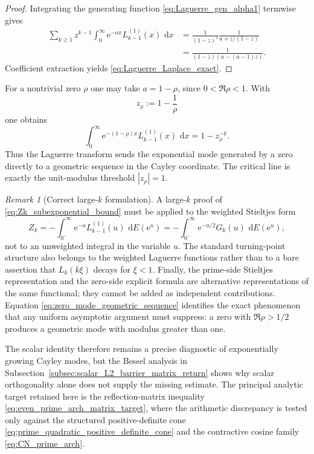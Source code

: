 \documentclass[11pt]{amsart}
\numberwithin{equation}{section}
\theoremstyle{plain}
\theoremstyle{definition}
\theoremstyle{remark}
\newtheorem{remark}[theorem]{Remark}
\newcommand{\e}{\mathrm e}
\newcommand{\dd}{\,\mathrm d}
\begin{document}
\begin{proof}
Integrating the generating function \eqref{eq:Laguerre_gen_alpha1} termwise gives
\begin{align}
 \sum_{k\ge1}z^{k-1}
 \int_0^\infty \e^{-ax}L_{k-1}^{(1)}(x)\,\dd x
 &=\frac{1}{(1-z)^2}
 \frac{1}{a+z/(1-z)}\\
 &=\frac{1}{(1-z)(a-(a-1)z)}.
\end{align}
Coefficient extraction yields \eqref{eq:Laguerre_Laplace_exact}.
\end{proof}

For a nontrivial zero $\rho$ one may take $a=1-\rho$, since $0<\Re\rho<1$.  With
\begin{equation}
 z_\rho:=1-\frac1\rho
 \label{eq:zrho_laguerre}
\end{equation}
one obtains
\begin{equation}
 \int_0^\infty
 \e^{-(1-\rho)x}L_{k-1}^{(1)}(x)\,\dd x
 =1-z_\rho^{-k}.
 \label{eq:zero_mode_geometric_sequence}
\end{equation}
Thus the Laguerre transform sends the exponential mode generated by a zero directly to a geometric sequence in the Cayley coordinate.  The critical line is exactly the unit-modulus threshold $|z_\rho|=1$.

\begin{remark}[Correct large-$k$ formulation]
\label{rem:laguerre_asymptotic_route}
A large-$k$ proof of \eqref{eq:Zk_subexponential_bound} must be applied to the weighted Stieltjes form
\begin{equation}
 Z_k
 =-\int_{0^-}^{\infty}
 \e^{-u}L_{k-1}^{(1)}(u)\,\dd E(\e^u)
 =-\int_{0^-}^{\infty}
 \e^{-u/2}G_k(u)\,\dd E(\e^u),
 \label{eq:Zk_weighted_u_form}
\end{equation}
not to an unweighted integral in the variable $u$.  The standard turning-point structure also belongs to the weighted Laguerre functions rather than to a bare assertion that $L_k(k\xi)$ decays for $\xi<1$.  Finally, the prime-side Stieltjes representation and the zero-side explicit formula are alternative representations of the same functional; they cannot be added as independent contributions.  Equation \eqref{eq:zero_mode_geometric_sequence} identifies the exact phenomenon that any uniform asymptotic argument must suppress: a zero with $\Re\rho>1/2$ produces a geometric mode with modulus greater than one.
\end{remark}

The scalar identity therefore remains a precise diagnostic of exponentially growing Cayley modes, but the Bessel analysis in Subsection~\ref{subsec:scalar_L2_barrier_matrix_return} shows why scalar orthogonality alone does not supply the missing estimate.  The principal analytic target retained here is the reflection-matrix inequality \eqref{eq:even_prime_arch_matrix_target}, where the arithmetic discrepancy is tested only against the structured positive-definite cone \eqref{eq:prime_quadratic_positive_definite_cone} and the contractive cosine family \eqref{eq:CN_prime_arch}.
\end{document}
